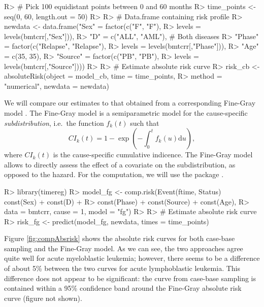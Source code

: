 \documentclass[
]{jss}
\begin{document}
\begin{CodeChunk}

\begin{CodeInput}
R> # Pick 100 equidistant points between 0 and 60 months
R> time_points <- seq(0, 60, length.out = 50)
R> 
R> # Data.frame containing risk profile
R> newdata <- data.frame("Sex" = factor(c("F", "F"), 
R>                                      levels = levels(bmtcrr[,"Sex"])),
R>                       "D" = c("ALL", "AML"), # Both diseases
R>                       "Phase" = factor(c("Relapse", "Relapse"), 
R>                                        levels = levels(bmtcrr[,"Phase"])),
R>                       "Age" = c(35, 35),
R>                       "Source" = factor(c("PB", "PB"), 
R>                                         levels = levels(bmtcrr[,"Source"])))
R> 
R> # Estimate absolute risk curve
R> risk_cb <- absoluteRisk(object = model_cb, time = time_points,
R>                         method = "numerical", newdata = newdata)
\end{CodeInput}
\end{CodeChunk}

We will compare our estimates to that obtained from a corresponding
Fine-Gray model \citep{fine1999proportional}. The Fine-Gray model is a
semiparametric model for the cause-specific \emph{subdistribution},
i.e.~the function \(f_k(t)\) such that
\[CI_k(t) =1 - \exp\left( - \int_0^t f_k(u) \textrm{d}u \right),\] where
\(CI_k(t)\) is the cause-specific cumulative indicence. The Fine-Gray
model allows to directly assess the effect of a covariate on the
subdistribution, as opposed to the hazard. For the computation, we will
use the  package \citep{timereg}.

\begin{CodeChunk}

\begin{CodeInput}
R> library(timereg)
R> model_fg <- comp.risk(Event(ftime, Status) ~ const(Sex) + const(D) + 
R>                           const(Phase) + const(Source) + const(Age), 
R>                       data = bmtcrr, cause = 1, model = "fg")
R> 
R> # Estimate absolute risk curve
R> risk_fg <- predict(model_fg, newdata, times = time_points)
\end{CodeInput}
\end{CodeChunk}

Figure \ref{fig:compAbsrisk} shows the absolute risk curves for both
case-base sampling and the Fine-Gray model. As we can see, the two
approaches agree quite well for acute myeloblastic leukemia; however,
there seems to be a difference of about 5\% between the two curves for
acute lymphoblastic leukemia. This difference does not appear to be
significant: the curve from case-base sampling is contained within a
95\% confidence band around the Fine-Gray absolute risk curve (figure
not shown).
\end{document}
